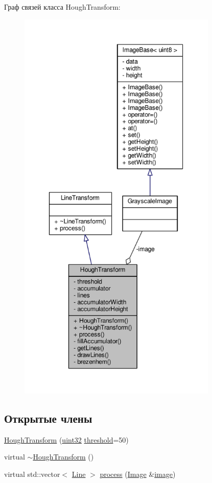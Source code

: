 Граф связей класса Hough\+Transform\+:
\nopagebreak
\begin{figure}[H]
\begin{center}
\leavevmode
\includegraphics[height=550pt]{dc/d45/class_hough_transform__coll__graph}
\end{center}
\end{figure}
\subsection*{Открытые члены}
\begin{DoxyCompactItemize}
\item 
\hyperlink{class_hough_transform_aa0129504dee413d479db4f400047e525}{Hough\+Transform} (\hyperlink{number_8h_a1134b580f8da4de94ca6b1de4d37975e}{uint32} \hyperlink{class_hough_transform_aa9de5274a062b1725689fbbc6f0799f7}{threshold}=50)
\item 
virtual \hyperlink{class_hough_transform_a1bcf9b1138d21afd88db2a96873ff741}{$\sim$\+Hough\+Transform} ()
\item 
virtual std\+::vector$<$ \hyperlink{class_line}{Line} $>$ \hyperlink{class_hough_transform_ab10d9e25f492521d6436701107b93fac}{process} (\hyperlink{class_image}{Image} \&\hyperlink{class_hough_transform_a0fe725cb1f0e3078096c3d7e9dee85f7}{image})
\end{DoxyCompactItemize}
